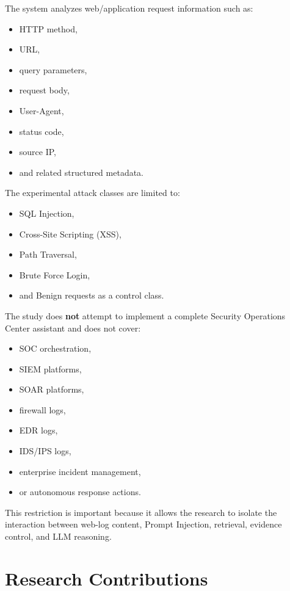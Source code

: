 The system analyzes web/application request information such as:

\begin{itemize}
\tightlist
\item
  HTTP method,
\item
  URL,
\item
  query parameters,
\item
  request body,
\item
  User-Agent,
\item
  status code,
\item
  source IP,
\item
  and related structured metadata.
\end{itemize}

The experimental attack classes are limited to:

\begin{itemize}
\tightlist
\item
  SQL Injection,
\item
  Cross-Site Scripting (XSS),
\item
  Path Traversal,
\item
  Brute Force Login,
\item
  and Benign requests as a control class.
\end{itemize}

The study does \textbf{not} attempt to implement a complete Security
Operations Center assistant and does not cover:

\begin{itemize}
\tightlist
\item
  SOC orchestration,
\item
  SIEM platforms,
\item
  SOAR platforms,
\item
  firewall logs,
\item
  EDR logs,
\item
  IDS/IPS logs,
\item
  enterprise incident management,
\item
  or autonomous response actions.
\end{itemize}

This restriction is important because it allows the research to isolate
the interaction between web-log content, Prompt Injection, retrieval,
evidence control, and LLM reasoning.

\section{Research Contributions}\label{research-contributions}


